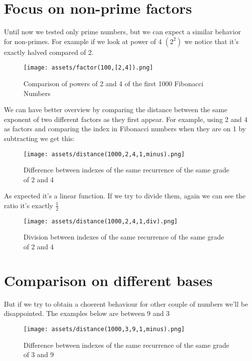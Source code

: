 \documentclass[amsmath,amssymb,aps,pra,reprint,groupedaddress,showpacs]{revtex4-1}
\begin{document}

\section{Focus on non-prime factors}

Until now we tested only prime numbers, but we can expect a similar behavior for non-primes.
For example if we look at power of 4 $(2^2)$ we notice that it's exactly halved compared of 2. 

\begin{figure}[H]
\centering
\texttt{[image: assets/factor(100,[2,4]).png]}
\caption{Comparison of powers of 2 and 4 of the first 1000 Fibonacci Numbers}
\end{figure}

We can have better overview by comparing the distance between the same exponent of two different factors 
as they first appear. For example, using 2 and 4 as factors and comparing the index in Fibonacci numbers
when they are on 1 by subtracting we get this:

\begin{figure}[H]
\centering
\texttt{[image: assets/distance(1000,2,4,1,minus).png]}
\caption{Difference between indexes of the same recurrence of the same grade of 2 and 4}
\end{figure}

As expected it's a linear function. If we try to divide them, again we can see the ratio it's exactly $\frac{1}{2}$

\begin{figure}[H]
\centering
\texttt{[image: assets/distance(1000,2,4,1,div).png]}
\caption{Division between indexes of the same recurrence of the same grade of 2 and 4}
\end{figure}

\section{Comparison on different bases}

But if we try to obtain a choerent behaviour for other couple of numbers we'll be disappointed. The examples below are between 9 and 3

\begin{figure}[H]
\centering
\texttt{[image: assets/distance(1000,3,9,1,minus).png]}
\caption{Difference between indexes of the same recurrence of the same grade of 3 and 9}
\end{figure}
\end{document}
